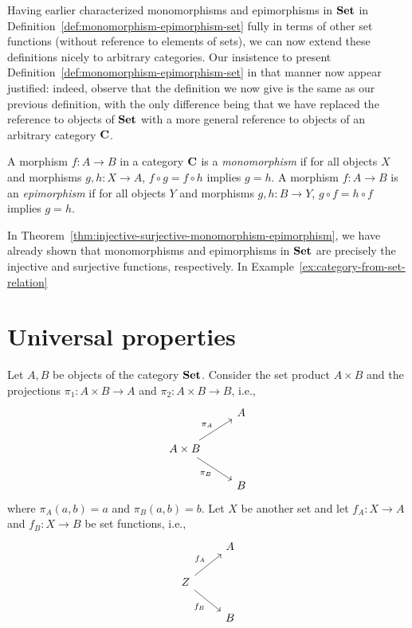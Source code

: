 Having earlier characterized monomorphisms and epimorphisms in \(\mathbf{Set}\) in
Definition~\ref{def:monomorphism-epimorphism-set} fully in terms of other set
functions (without reference to elements of sets), we can now extend these
definitions nicely to arbitrary categories. Our insistence to present
Definition~\ref{def:monomorphism-epimorphism-set} in that manner now appear
justified: indeed, observe that the definition we now give is the same as our
previous definition, with the only difference being that we have replaced the
reference to objects of \(\mathbf{Set}\) with a more general reference to objects of an
arbitrary category \(\mathbf{C}\).

\begin{definition}
    \label{def:monomorphism-epimorphism-category}
    A morphism \(f: A \to B\) in a category \(\mathbf{C}\) is a
    \emph{monomorphism} if for all objects \(X\) and morphisms \(g, h: X \to
    A\), \(f \circ g = f \circ h\) implies \(g = h\). A morphism \(f: A \to B\)
    is an \emph{epimorphism} if for all objects \(Y\) and morphisms \(g, h: B
    \to Y\), \(g \circ f = h \circ f\) implies \(g = h\).
\end{definition}

In Theorem~\ref{thm:injective-surjective-monomorphism-epimorphism}, we have
already shown that monomorphisms and epimorphisms in \(\mathbf{Set}\) are precisely the
injective and surjective functions, respectively. In
Example~\ref{ex:category-from-set-relation}


\section{Universal properties}

\begin{example}
    \label{ex:product-set-universal-property}
    Let \(A, B\) be objects of the category \(\mathbf{Set}\). Consider the set product
    \(A \times B\) and the projections \(\pi_1: A \times B \to A\) and \(\pi_2:
    A \times B \to B\), i.e.,
    \[
        \begin{tikzcd}
            & A \\
            A\times B \arrow[ru, "\pi_A"] \arrow[rd, "\pi_B"'] &   \\
            & B
    \end{tikzcd}
    \]
    where \(\pi_A(a, b) = a\) and \(\pi_B(a, b) = b\). Let \(X\) be another set
    and let \(f_A : X \to A\) and \(f_B : X \to B\) be set functions, i.e.,
    \[
        \begin{tikzcd}
                & A \\
        Z \arrow[ru, "f_A"] \arrow[rd, "f_B"'] &   \\
                & B
    \end{tikzcd}
    \]
    
\end{example}